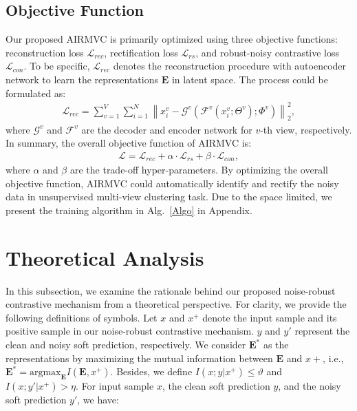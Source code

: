 \documentclass{article}
\theoremstyle{plain}
\theoremstyle{definition}
\theoremstyle{remark}
\begin{document}
\subsection{Objective Function}
Our proposed AIRMVC is primarily optimized using three objective functions: reconstruction loss $\mathcal{L}_{rec}$, rectification loss $\mathcal{L}_{rs}$, and robust-noisy contrastive loss $\mathcal{L}_{con}$. To be specific, $\mathcal{L}_{rec}$ denotes the reconstruction procedure with autoencoder network to learn the representations $\textbf{E}$ in latent space. The process could be formulated as:
\begin{equation}
\begin{aligned}
\mathcal{L}_{rec} = \sum_{v=1}^V \sum_{i=1}^N  \left \| x_i^v - \mathcal{G}^v(\mathcal{F}^v(x_i^v; \Theta^v); \Phi^v) \right \|_2^2, 
\end{aligned}
\label{rec_loss}
\end{equation}
where $\mathcal{G}^v$ and $\mathcal{F}^v$ are the decoder and encoder network for $v$-th view, respectively. In summary, the overall objective function of AIRMVC is:
\begin{equation}
\begin{aligned}
\mathcal{L} = \mathcal{L}_{rec} + \alpha \cdot \mathcal{L}_{rs} + \beta \cdot \mathcal{L}_{con},
\end{aligned}
\label{total_loss}
\end{equation}
where $\alpha$ and $\beta$ are the trade-off hyper-parameters. By optimizing the overall objective function, AIRMVC could automatically identify and rectify the noisy data in unsupervised multi-view clustering task. Due to the space limited, we present the training algorithm in Alg.~\ref{Algo} in Appendix.



\section{Theoretical Analysis}
In this subsection, we examine the rationale behind our proposed noise-robust contrastive mechanism from a theoretical perspective. For clarity, we provide the following definitions of symbols. Let $x$ and $x^+$ denote the input sample and its positive sample in our noise-robust contrastive mechanism. $y$ and $y'$ represent the clean and noisy soft prediction, respectively. We consider $\textbf{E}^*$ as the representations by maximizing the mutual information between $\textbf{E}$ and $x+$, i.e., $\textbf{E}^* = \text{argmax}_{\textbf{E}} I(\textbf{E}, x^+)$. Besides, we define $I(x;y|x^+) \le \vartheta$ and $I(x;y'|x^+) > \eta$. For input sample $x$, the clean soft prediction $y$, and the noisy soft prediction $y'$, we have:
\end{document}
